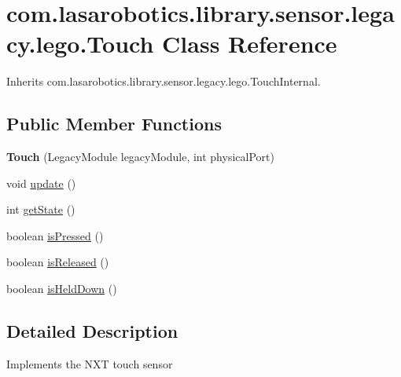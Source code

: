 \hypertarget{classcom_1_1lasarobotics_1_1library_1_1sensor_1_1legacy_1_1lego_1_1_touch}{}\section{com.\+lasarobotics.\+library.\+sensor.\+legacy.\+lego.\+Touch Class Reference}
\label{classcom_1_1lasarobotics_1_1library_1_1sensor_1_1legacy_1_1lego_1_1_touch}


Inherits com.\+lasarobotics.\+library.\+sensor.\+legacy.\+lego.\+Touch\+Internal.

\subsection*{Public Member Functions}
\begin{DoxyCompactItemize}
\item 
\hypertarget{classcom_1_1lasarobotics_1_1library_1_1sensor_1_1legacy_1_1lego_1_1_touch_a70cd8e9f598e03083eadb6343d4ea1b5}{}{\bfseries Touch} (Legacy\+Module legacy\+Module, int physical\+Port)\label{classcom_1_1lasarobotics_1_1library_1_1sensor_1_1legacy_1_1lego_1_1_touch_a70cd8e9f598e03083eadb6343d4ea1b5}

\item 
void \hyperlink{classcom_1_1lasarobotics_1_1library_1_1sensor_1_1legacy_1_1lego_1_1_touch_a8b1fcbcb801fb13c9730daae917cc18a}{update} ()
\item 
int \hyperlink{classcom_1_1lasarobotics_1_1library_1_1sensor_1_1legacy_1_1lego_1_1_touch_ab02a8086285d6decd13265e350086c3e}{get\+State} ()
\item 
boolean \hyperlink{classcom_1_1lasarobotics_1_1library_1_1sensor_1_1legacy_1_1lego_1_1_touch_a3423069729ce7a734a3034c8efe70f41}{is\+Pressed} ()
\item 
boolean \hyperlink{classcom_1_1lasarobotics_1_1library_1_1sensor_1_1legacy_1_1lego_1_1_touch_a6da400aed9da1845af0206d27413ddf0}{is\+Released} ()
\item 
boolean \hyperlink{classcom_1_1lasarobotics_1_1library_1_1sensor_1_1legacy_1_1lego_1_1_touch_a378f297baa406cef063392c661d06a41}{is\+Held\+Down} ()
\end{DoxyCompactItemize}


\subsection{Detailed Description}
Implements the N\+X\+T touch sensor 

